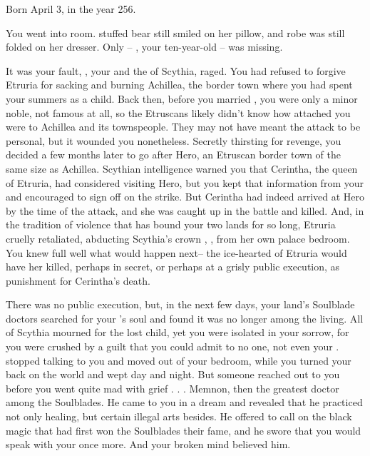 \documentclass[char]{Kos}
\begin{document}
\name{\cQueenTwo{}}


Born April 3, in the year 256.

You went into \cFugitive{\their} room. \cFugitive{\Their} stuffed bear still smiled on her pillow, and \cFugitive{\their} robe was still folded on her dresser. Only \cFugitive{\they}-- \cFugitive{\realname}, your ten-year-old  \cFugitive{\offspring}-- was missing.

It was your fault, \cScythiaKing{\nickname}, your \cScythiaKing{\spouse} and the \cScythiaKing{\monarch} of Scythia, raged. You had refused to forgive Etruria for sacking and burning Achillea, the border town where you had spent your summers as a child. Back then, before you married \cScythiaKing{\nickname}, you were only a minor noble, not famous at all, so the Etruscans likely didn't know how attached you were to Achillea and its townspeople. They may not have meant the attack to be personal, but it wounded you nonetheless. Secretly thirsting for revenge, you decided a few months later to go after Hero, an Etruscan border town of the same size as Achillea. Scythian intelligence warned you that Cerintha, the queen of Etruria, had considered visiting Hero, but you kept that information from your \cScythiaKing{\spouse} and encouraged \cScythiaKing{\them} to sign off on the strike. But Cerintha had indeed arrived at Hero by the time of the attack, and she was caught up in the battle and killed. And, in the tradition of violence that has bound your two lands for so long, Etruria cruelly retaliated, abducting Scythia's crown \cFugitive{\prince}, \cFugitive{\realname}, from her own palace bedroom. You knew full well what would happen next-- the ice-hearted \cEtruriaKing{\Monarch} of Etruria would have her killed, perhaps in secret, or perhaps at a grisly public execution, as punishment for Cerintha's death.

There was no public execution, but, in the next few days, your land's Soulblade doctors searched for your \cFugitive{\offspring}'s soul and found it was no longer among the living. All of Scythia mourned for the lost child, yet you were isolated in your sorrow, for you were crushed by a guilt that you could admit to no one, not even your \cScythiaKing{\spouse}.  stopped talking to you and moved out of your bedroom, while you turned your back on the world and wept day and night. But someone reached out to you before you went quite mad with grief . . . Memnon, then the greatest doctor among the Soulblades. He came to you in a dream and revealed that he practiced not only healing, but certain illegal arts besides. He offered to call on the black magic that had first won the Soulblades their fame, and he swore that you would speak with your \cFugitive{\offspring} once more. And your broken mind believed him.
\end{document}
